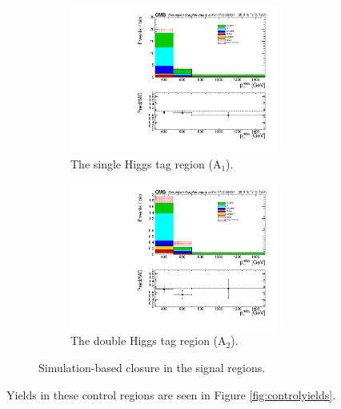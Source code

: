 \begin{figure}[htbp]
\begin{subfigure}[b]{0.5\textwidth}
\begin{centering}
\includegraphics[width=0.75\textwidth]{figs/MCclosure_singleHiggsRegionTotal.pdf}
\caption{The single Higgs tag region (A$_{1}$).}
\end{centering}
\end{subfigure}
\begin{subfigure}[b]{0.5\textwidth}
\begin{centering}
\includegraphics[width=0.75\textwidth]{figs/MCclosure_doubleHiggsRegionTotal.pdf}
\caption{The double Higgs tag region (A$_{2}$).}
\end{centering}
\end{subfigure}
\caption{Simulation-based closure in the signal regions.}
\label{fig:mcclosure}
\end{figure}

Yields in these control regions are seen in Figure \ref{fig:controlyields}.

